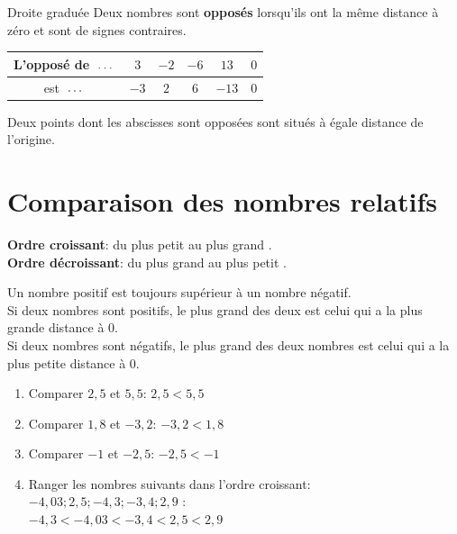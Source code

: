 \documentclass[12pt]{article}
\newif\iftrou\troufalse
\newlength{\trouwidth}
\newcommand{\trou}[1]{%
	\iftrou%
	\settowidth{\trouwidth}{#1}%
	\hbox to \trouwidth{\dotfill}%
	\else%
	#1%
	\fi}
\newcommand\pointille[1][1cm]{\makebox[#1]{\dotfill}}
\begin{document}
\begin{defin}{Droite graduée}{}
	Deux nombres sont \trou{\textbf{opposés}} lorsqu’ils ont la même distance à zéro et sont de signes contraires.
\end{defin}



\begin{ex}{}{}
\begin{center}
	\begin{tabular}{|c|c|c|c|c|c|}
		
		\hline
		L'opposé de $\pointille[0.6cm]$ & $3$ & $-2$ & $-6$ & $13$ & $0$ \\
		\hline
		est $\pointille[0.6cm]$ & \trou{$-3$} & \trou{$2$} & \trou{$6$} & \trou{$-13$} & \trou{$0$} \\
		\hline
	\end{tabular}	
\end{center}
\end{ex}

\begin{rem}{}{}
	Deux points dont les abscisses sont opposées sont situés à égale distance de l’origine.
\end{rem}


\section{Comparaison des nombres relatifs}

\begin{defin}{}{}
	\textbf{Ordre croissant}: \trou{du plus petit au plus grand}.\\
	\textbf{Ordre décroissant}: \trou{du plus grand au plus petit}.
\end{defin}

\begin{prop}{}{}
	Un nombre positif est toujours \trou{supérieur} à un nombre négatif.\\
	Si deux nombres sont positifs, le plus grand des deux est celui qui a la plus grande
	distance à 0.\\
	Si deux nombres sont négatifs, le plus grand des deux nombres est celui qui a la
	plus petite distance à 0.	
\end{prop}

\begin{ex}{}{}
	\begin{enumerate}
		\item Comparer $2,5$ et $5,5$: \trou{$2,5<5,5$}
		\item Comparer $1,8$ et $-3,2$: \trou{$-3,2<1,8$}
		\item Comparer $-1$ et $-2,5$: \trou{$-2,5<-1$}
		\item Ranger les nombres suivants dans l'ordre croissant: $ -4,03  ;  2,5  ;  -4,3  ;  -3,4  ;  2,9$ :\\
		 \trou{$-4,3 < -4,03 <-3,4 < 2,5< 2,9$}
	\end{enumerate}
\end{ex}
\end{document}
